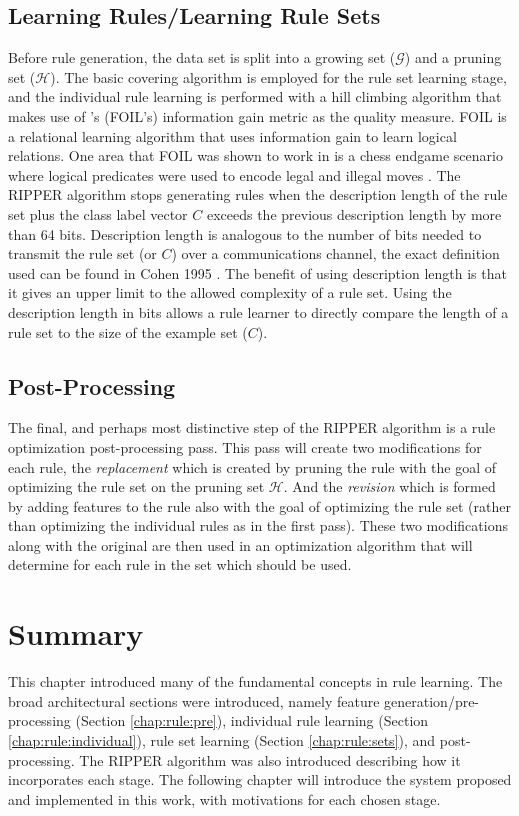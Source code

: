 \subsection{Learning Rules/Learning Rule Sets}
Before rule generation, the data set is split into a growing set ($\mathcal{G}$) and a pruning set ($\mathcal{H}$).
The basic covering algorithm is employed for the rule set learning stage, and the individual rule learning is performed with a hill climbing algorithm that makes use of \FOIL's (FOIL's) \cite{quinlan1990foil} information gain metric as the quality measure.
FOIL is a relational learning algorithm that uses information gain to learn logical relations. One area that FOIL was shown to work in is a chess endgame scenario where logical predicates were used to encode legal and illegal moves \cite{quinlan1990foil}.
The RIPPER algorithm stops generating rules when the description length of the rule set plus the class label vector $C$ exceeds the previous description length by more than 64 bits. Description length is analogous to the number of bits needed to transmit the rule set (or $C$) over a communications channel, the exact definition used can be found in Cohen 1995 \cite{cohen1995ripper}. The benefit of using description length is that it gives an upper limit to the allowed complexity of a rule set.
Using the description length in bits allows a rule learner to directly compare the length of a rule set to the size of the example set ($C$).

\subsection{Post-Processing}
The final, and perhaps most distinctive step of the RIPPER algorithm is a rule optimization post-processing pass. This pass will create two modifications for each rule, the \emph{replacement} which is created by pruning the rule with the goal of optimizing the rule set on the pruning set $\mathcal{H}$. And the \emph{revision} which is formed by adding features to the rule also with the goal of optimizing the rule set (rather than optimizing the individual rules as in the first pass). These two modifications along with the original are then used in an optimization algorithm that will determine for each rule in the set which should be used.


\section{Summary}

This chapter introduced many of the fundamental concepts in rule learning. The broad architectural sections were introduced, namely feature generation/pre-processing (Section \ref{chap:rule:pre}), individual rule learning (Section \ref{chap:rule:individual}), rule set learning (Section \ref{chap:rule:sets}), and post-processing. The RIPPER algorithm was also introduced describing how it incorporates each stage. The following chapter will introduce the system proposed and implemented in this work, with motivations for each chosen stage.
